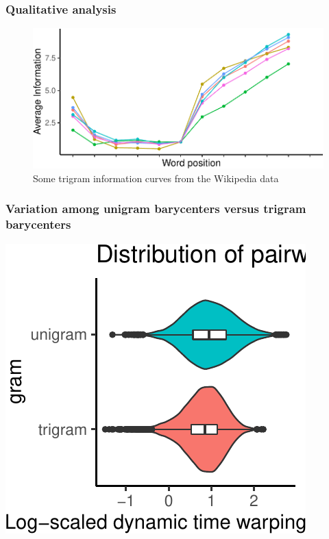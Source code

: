 \documentclass[
  english,
  man,floatsintext]{apa6}
\begin{document}
\hypertarget{qualitative-analysis}{%
\subsubsection{Qualitative analysis}\label{qualitative-analysis}}

\begin{figure}
\centering
\includegraphics{figs/wiki-trigrams-1.pdf}
\caption{\label{fig:wiki-trigrams}Some trigram information curves from the Wikipedia data}
\end{figure}

\hypertarget{variation-among-unigram-barycenters-versus-trigram-barycenters}{%
\subsubsection{Variation among unigram barycenters versus trigram barycenters}\label{variation-among-unigram-barycenters-versus-trigram-barycenters}}

\includegraphics{figs/plot-1.pdf}
\end{document}
